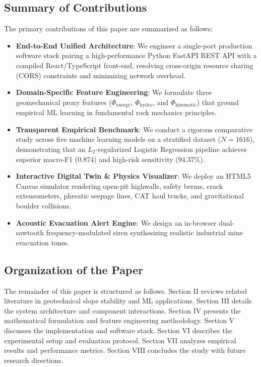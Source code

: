 \documentclass[conference]{IEEEtran}
\begin{document}
\subsection{Summary of Contributions}
The primary contributions of this paper are summarized as follows:
\begin{itemize}
    \item \textbf{End-to-End Unified Architecture}: We engineer a single-port production software stack pairing a high-performance Python FastAPI REST API with a compiled React/TypeScript front-end, resolving cross-origin resource sharing (CORS) constraints and minimizing network overhead.
    \item \textbf{Domain-Specific Feature Engineering}: We formulate three geomechanical proxy features ($\Phi_{\text{energy}}$, $\Phi_{\text{hydro}}$, and $\Phi_{\text{kinematic}}$) that ground empirical ML learning in fundamental rock mechanics principles.
    \item \textbf{Transparent Empirical Benchmark}: We conduct a rigorous comparative study across five machine learning models on a stratified dataset ($N=1616$), demonstrating that an $L_2$-regularized Logistic Regression pipeline achieves superior macro-F1 (0.874) and high-risk sensitivity (94.37\%).
    \item \textbf{Interactive Digital Twin \& Physics Visualizer}: We deploy an HTML5 Canvas simulator rendering open-pit highwalls, safety berms, crack extensometers, phreatic seepage lines, CAT haul trucks, and gravitational boulder collisions.
    \item \textbf{Acoustic Evacuation Alert Engine}: We design an in-browser dual-sawtooth frequency-modulated siren synthesizing realistic industrial mine evacuation tones.
\end{itemize}

\subsection{Organization of the Paper}
The remainder of this paper is structured as follows. Section II reviews related literature in geotechnical slope stability and ML applications. Section III details the system architecture and component interactions. Section IV presents the mathematical formulation and feature engineering methodology. Section V discusses the implementation and software stack. Section VI describes the experimental setup and evaluation protocol. Section VII analyzes empirical results and performance metrics. Section VIII concludes the study with future research directions.
\end{document}
